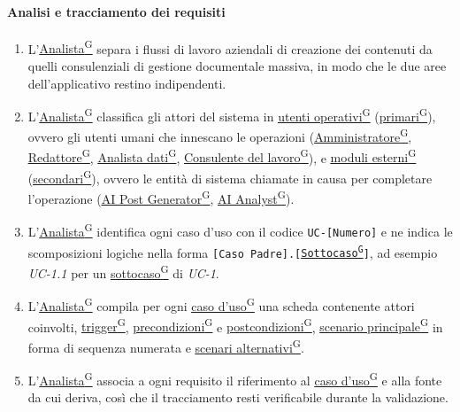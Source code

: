 \documentclass[a4paper,12pt]{article}
\providecommand{\glslink}[2]{\href{https://alittlebyte-19.github.io/Documentazione/glossario.html\#gls-#1}{\underline{#2}\textsuperscript{\scriptsize G}}}
\begin{document}
\paragraph{Analisi e tracciamento dei requisiti}
\begin{enumerate}
    \item L'\glslink{analista}{Analista} separa i flussi di lavoro aziendali di creazione dei contenuti da quelli consulenziali di gestione documentale massiva, in modo che le due aree dell'applicativo restino indipendenti.
    \item L'\glslink{analista}{Analista} classifica gli attori del sistema in \glslink{utente-operativo}{utenti operativi} (\glslink{attore-primario}{primari}), ovvero gli utenti umani che innescano le operazioni (\glslink{amministratore}{Amministratore}, \glslink{redattore}{Redattore}, \glslink{analista-dati}{Analista dati}, \glslink{consulente-del-lavoro-cdl}{Consulente del lavoro}), e \glslink{moduli-esterni}{moduli esterni} (\glslink{attore-secondario}{secondari}), ovvero le entità di sistema chiamate in causa per completare l'operazione (\glslink{ai-post-generator}{AI Post Generator}, \glslink{ai-analyst}{AI Analyst}).
    \item L'\glslink{analista}{Analista} identifica ogni caso d'uso con il codice \texttt{UC-[Numero]} e ne indica le scomposizioni logiche nella forma \texttt{[Caso Padre].[\glslink{sottocaso}{Sottocaso}]}, ad esempio \textit{UC-1.1} per un \glslink{sottocaso}{sottocaso} di \textit{UC-1}.
    \item L'\glslink{analista}{Analista} compila per ogni \glslink{caso-d-uso-uc}{caso d'uso} una scheda contenente attori coinvolti, \glslink{trigger}{trigger}, \glslink{precondizioni}{precondizioni} e \glslink{postcondizioni}{postcondizioni}, \glslink{scenario-principale}{scenario principale} in forma di sequenza numerata e \glslink{scenario-alternativo}{scenari alternativi}.
    \item L'\glslink{analista}{Analista} associa a ogni requisito il riferimento al \glslink{caso-d-uso-uc}{caso d'uso} e alla fonte da cui deriva, così che il tracciamento resti verificabile durante la validazione.
\end{enumerate}
\end{document}

